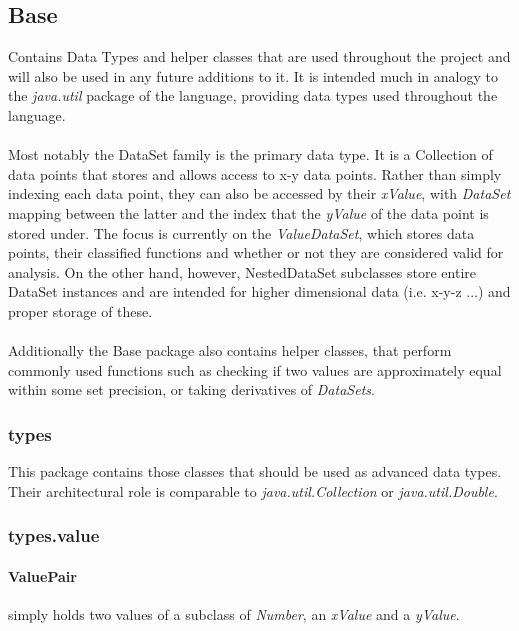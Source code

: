 \documentclass{article}
\begin{document}
  \subsection{Base}
  
  Contains Data Types and helper classes that are used throughout the project and will also be used in any future additions to it. It is intended much in analogy to the \emph{java.util} package of the language, providing data types used throughout the language. 
  \\\\
  Most notably the DataSet family is the primary data type. It is a Collection of data points that stores and allows access to x-y data points. Rather than simply indexing each data point, they can also be accessed by their \emph{xValue}, with \textit{DataSet} mapping between the latter and the index that the \emph{yValue} of the data point is stored under. The focus is currently on the \textit{ValueDataSet}, which stores data points, their classified functions and whether or not they are considered valid for analysis. On the other hand, however, NestedDataSet subclasses store entire DataSet instances and are intended for higher dimensional data (i.e. x-y-z ...) and proper storage of these.
  \\\\
  Additionally the Base package also contains helper classes, that perform commonly used functions such as checking if two values are approximately equal within some set precision, or taking derivatives of \textit{DataSets}.
  
  \subsubsection*{types}
  
  This package contains those classes that should be used as advanced data types. Their architectural role is comparable to \textit{java.util.Collection} or \textit{java.util.Double}.
  
  \subsubsection*{types.value}
  
  \paragraph{ValuePair} simply holds two values of a subclass of \textit{Number}, an \textit{xValue} and a \textit{yValue}.
  
\end{document}
